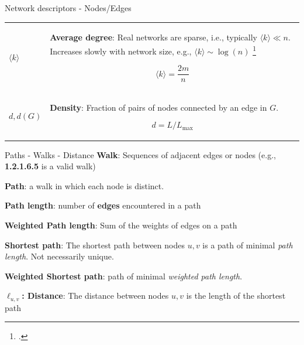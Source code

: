 \documentclass[a4paper,11pt]{book}
\begin{document}
\begin{textbox}{Network descriptors - Nodes/Edges}
\begin{tabular}{p{}|p{}}\scriptsize

$\langle k \rangle$ & \textbf{Average degree}:
Real networks are sparse, i.e., typically $\langle k \rangle \ll n$. Increases slowly with network size, e.g., $\langle k \rangle \sim \log(n)$ \footcite{leskovec2005graphs}

\[\langle k \rangle=\frac{2m}{n}\]\\

$d,d(G)$ & \textbf{Density}: Fraction of pairs of nodes connected by an edge in $G$.

\[d=L/L_{\max}
\]\\

\end{tabular}
\end{textbox}
















\begin{textbox}{Paths - Walks - Distance}
\textbf{Walk}: Sequences of adjacent edges or nodes (e.g., \textbf{1.2.1.6.5} is a valid walk)

\textbf{Path}: a walk in which each node is distinct.

\textbf{Path length}: number of \textbf{edges} encountered in a path

\textbf{Weighted Path length}: Sum of the weights of edges on a path


\textbf{Shortest path}: The shortest path between nodes $u,v$ is a path of minimal \textit{path length}. Not necessarily unique.

\textbf{Weighted Shortest path}: path of minimal \textit{weighted path length}.


\textbf{$\ell_{u,v}$: Distance}: The distance between nodes $u,v$ is the length of the shortest path


\end{textbox}
\end{document}
